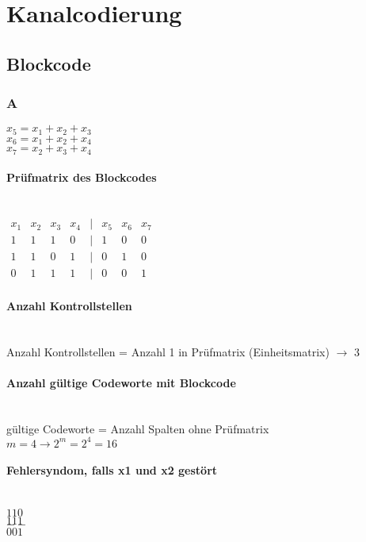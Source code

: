 

\section{Kanalcodierung}

\subsection{Blockcode}
\subsubsection{A}
$x_5=x_1+x_2+x_3$\\
$x_6=x_1+x_2+x_4$\\
$x_7=x_2+x_3+x_4$

\paragraph{Prüfmatrix des Blockcodes}\mbox{}\\
$\begin{matrix}
    x_1 & x_2 & x_3 & x_4 & | & x_5 & x_6 & x_7\\
    1 & 1 & 1 & 0 & | & 1 & 0 & 0\\
    1 & 1 & 0 & 1 & | & 0 & 1 & 0\\
    0 & 1 & 1 & 1 & | & 0 & 0 & 1
\end{matrix}$

\paragraph{Anzahl Kontrollstellen}\mbox{}\\
Anzahl Kontrollstellen = Anzahl 1 in Prüfmatrix (Einheitsmatrix) $\rightarrow$ 3

\paragraph{Anzahl gültige Codeworte mit Blockcode}\mbox{}\\
gültige Codeworte = Anzahl Spalten ohne Prüfmatrix\\
$m=4 \rightarrow 2^m=2^4=16$

\paragraph{Fehlersyndom, falls x1 und x2 gestört}\mbox{}\\
$110$\\
$111$\\
$--$\\
$001$

